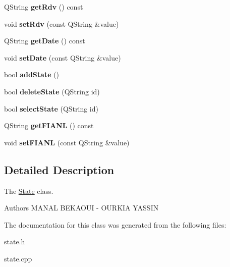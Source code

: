 \begin{DoxyCompactItemize}
Q\+String {\bfseries get\+Rdv} () const
\item 
\mbox{\label{class_state_a20029d32d294b2dcda3569ce5e512433}} 
void {\bfseries set\+Rdv} (const Q\+String \&value)
\item 
\mbox{\label{class_state_a79d251bdbc65d2611d4281bf2eb5aa84}} 
Q\+String {\bfseries get\+Date} () const
\item 
\mbox{\label{class_state_a04e8a4f0f1574f7fba482971b48779ed}} 
void {\bfseries set\+Date} (const Q\+String \&value)
\item 
\mbox{\label{class_state_a51330e1a9e02a0e086d1627f4b488242}} 
bool {\bfseries add\+State} ()
\item 
\mbox{\label{class_state_a0cde655ef90979c58d0d4a10af13680c}} 
bool {\bfseries delete\+State} (Q\+String id)
\item 
\mbox{\label{class_state_aa5ebecfef389f53f99341ccb5df8de35}} 
bool {\bfseries select\+State} (Q\+String id)
\item 
\mbox{\label{class_state_a5b4cc8d273139472dead50c12c3aef3f}} 
Q\+String {\bfseries get\+F\+I\+A\+NL} () const
\item 
\mbox{\label{class_state_a335a98030204aa203a3bbe69cf3d8ed6}} 
void {\bfseries set\+F\+I\+A\+NL} (const Q\+String \&value)
\end{DoxyCompactItemize}


\subsection{Detailed Description}
The \mbox{\hyperlink{class_state}{State}} class. 

\begin{DoxyAuthor}{Authors}
M\+A\+N\+AL B\+E\+K\+A\+O\+UI -\/ O\+U\+R\+K\+IA Y\+A\+S\+S\+IN 
\end{DoxyAuthor}


The documentation for this class was generated from the following files\+:\begin{DoxyCompactItemize}
\item 
state.\+h\item 
state.\+cpp\end{DoxyCompactItemize}
